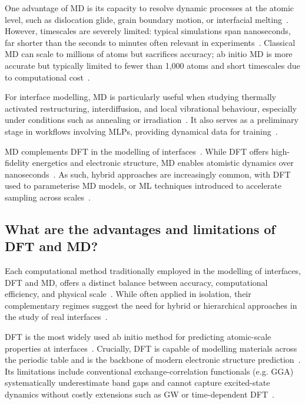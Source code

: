One advantage of MD is its capacity to resolve dynamic processes at the atomic level, such as dislocation glide, grain boundary motion, or interfacial melting~\cite{Chagarov2015-ol}.
However, timescales are severely limited: typical simulations span nanoseconds, far shorter than the seconds to minutes often relevant in experiments~\nocite{}.
Classical MD can scale to millions of atoms but sacrifices accuracy; ab initio MD is more accurate but typically limited to fewer than 1,000 atoms and short timescales due to computational cost~\cite{Khot2025-hh}.

For interface modelling, MD is particularly useful when studying thermally activated restructuring, interdiffusion, and local vibrational behaviour, especially under conditions such as annealing or irradiation~\nocite{}.
It also serves as a preliminary stage in workflows involving MLPs, providing dynamical data for training~\cite{Khot2025-hh}.

MD complements DFT in the modelling of interfaces~\nocite{}.
While DFT offers high-fidelity energetics and electronic structure, MD enables atomistic dynamics over nanoseconds~\cite{Khot2025-hh, Leung2020-tv, Arantes2007-ea}.
As such, hybrid approaches are increasingly common, with DFT used to parameterise MD models, or ML techniques introduced to accelerate sampling across scales~\cite{Schutt2018-xc, Butler2019-ws, Khot2025-hh}.

\subsection*{What are the advantages and limitations of DFT and MD?}

Each computational method traditionally employed in the modelling of interfaces, DFT and MD, offers a distinct balance between accuracy, computational efficiency, and physical scale~\nocite{}.
While often applied in isolation, their complementary regimes suggest the need for hybrid or hierarchical approaches in the study of real interfaces~\cite{Leung2020-tv}.

DFT is the most widely used ab initio method for predicting atomic-scale properties at interfaces~\cite{Cervantes2025-ze}.
Crucially, DFT is capable of modelling materials across the periodic table and is the backbone of modern electronic structure prediction~\nocite{}.
Its limitations include conventional exchange-correlation functionals (e.g. GGA) systematically underestimate band gaps and cannot capture excited-state dynamics without costly extensions such as GW or time-dependent DFT~\cite{Butler2019-ws, Khot2025-hh}.

